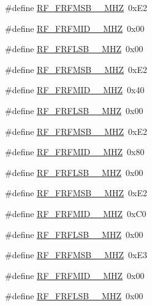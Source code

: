 \begin{DoxyCompactItemize}
\item 
\#define \hyperlink{sx1276Regs-Fsk_8h_ac103def8b55db2e68ecd74f622d05ec8}{R\+F\+\_\+\+F\+R\+F\+M\+S\+B\+\_\+\_\+\+M\+HZ}~0x\+E2
\item 
\#define \hyperlink{sx1276Regs-Fsk_8h_a68c181778920969fd320960aa9b8540a}{R\+F\+\_\+\+F\+R\+F\+M\+I\+D\+\_\+\_\+\+M\+HZ}~0x00
\item 
\#define \hyperlink{sx1276Regs-Fsk_8h_ad6aa652c01dd83e83eee08310a4ab27d}{R\+F\+\_\+\+F\+R\+F\+L\+S\+B\+\_\+\_\+\+M\+HZ}~0x00
\item 
\#define \hyperlink{sx1276Regs-Fsk_8h_acf4419e259f3ac0eaa240b5d276f2783}{R\+F\+\_\+\+F\+R\+F\+M\+S\+B\+\_\+\_\+\+M\+HZ}~0x\+E2
\item 
\#define \hyperlink{sx1276Regs-Fsk_8h_a5805cba8302e2b4cc090072e27e9b74a}{R\+F\+\_\+\+F\+R\+F\+M\+I\+D\+\_\+\_\+\+M\+HZ}~0x40
\item 
\#define \hyperlink{sx1276Regs-Fsk_8h_a54bc243265f355ba3398eaf560182add}{R\+F\+\_\+\+F\+R\+F\+L\+S\+B\+\_\+\_\+\+M\+HZ}~0x00
\item 
\#define \hyperlink{sx1276Regs-Fsk_8h_a55862c6f4752ba5add661f520ef78d85}{R\+F\+\_\+\+F\+R\+F\+M\+S\+B\+\_\+\_\+\+M\+HZ}~0x\+E2
\item 
\#define \hyperlink{sx1276Regs-Fsk_8h_ab9eed26517ae9101715c14e1f6ebe36a}{R\+F\+\_\+\+F\+R\+F\+M\+I\+D\+\_\+\_\+\+M\+HZ}~0x80
\item 
\#define \hyperlink{sx1276Regs-Fsk_8h_a51b43142f8e6f359f3fa9a2de957b0d6}{R\+F\+\_\+\+F\+R\+F\+L\+S\+B\+\_\+\_\+\+M\+HZ}~0x00
\item 
\#define \hyperlink{sx1276Regs-Fsk_8h_ac90d9f82ccd48696f5f6d5f3da034c95}{R\+F\+\_\+\+F\+R\+F\+M\+S\+B\+\_\+\_\+\+M\+HZ}~0x\+E2
\item 
\#define \hyperlink{sx1276Regs-Fsk_8h_ae7d275a31f9ef6141362da97cbc82ba0}{R\+F\+\_\+\+F\+R\+F\+M\+I\+D\+\_\+\_\+\+M\+HZ}~0x\+C0
\item 
\#define \hyperlink{sx1276Regs-Fsk_8h_a69c1b7d68cd9e8efbd11af9bf2d23141}{R\+F\+\_\+\+F\+R\+F\+L\+S\+B\+\_\+\_\+\+M\+HZ}~0x00
\item 
\#define \hyperlink{sx1276Regs-Fsk_8h_a46d253ce6ced063cf1d1ac2790b6b655}{R\+F\+\_\+\+F\+R\+F\+M\+S\+B\+\_\+\_\+\+M\+HZ}~0x\+E3
\item 
\#define \hyperlink{sx1276Regs-Fsk_8h_a1113a7007b474ba7a126649cd5000ed7}{R\+F\+\_\+\+F\+R\+F\+M\+I\+D\+\_\+\_\+\+M\+HZ}~0x00
\item 
\#define \hyperlink{sx1276Regs-Fsk_8h_a3b906ff98326799d71d01c4d0439c349}{R\+F\+\_\+\+F\+R\+F\+L\+S\+B\+\_\+\_\+\+M\+HZ}~0x00

\end{DoxyCompactItemize}

